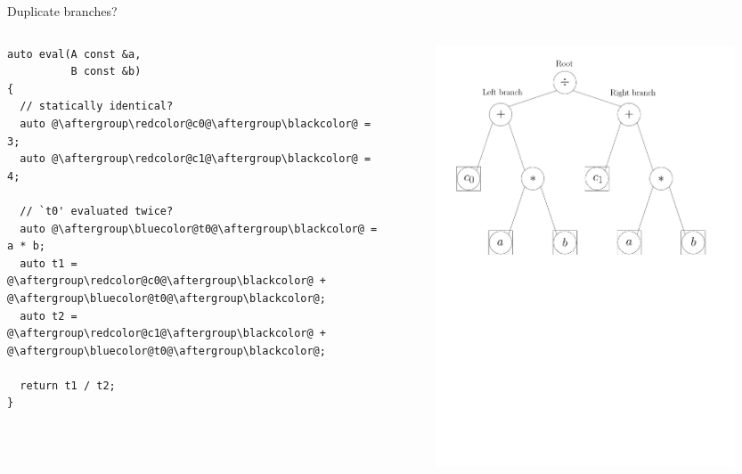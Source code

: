 \documentclass[xcolor=dvipsnames]{beamer}
\begin{document}
\begin{frame}[fragile]{Duplicate branches?}
  \begin{columns}[T] %
    \begin{column}{.49\textwidth}
        \begin{lstlisting}
auto eval(A const &a,
          B const &b)
{
  // statically identical?
  auto @\aftergroup\redcolor@c0@\aftergroup\blackcolor@ = 3;
  auto @\aftergroup\redcolor@c1@\aftergroup\blackcolor@ = 4;

  // `t0' evaluated twice?
  auto @\aftergroup\bluecolor@t0@\aftergroup\blackcolor@ = a * b;
  auto t1 = @\aftergroup\redcolor@c0@\aftergroup\blackcolor@ + @\aftergroup\bluecolor@t0@\aftergroup\blackcolor@;
  auto t2 = @\aftergroup\redcolor@c1@\aftergroup\blackcolor@ + @\aftergroup\bluecolor@t0@\aftergroup\blackcolor@;

  return t1 / t2;
}
  \end{lstlisting}
    \end{column}%
    \hfill%
    \begin{column}{0.49\textwidth}
\begin{figure}[H]
 \centering
 \includegraphics[width=0.99\textwidth]{fig_exprtree}
\end{figure}
    \end{column}%
  \end{columns}
\end{frame}
\end{document}
